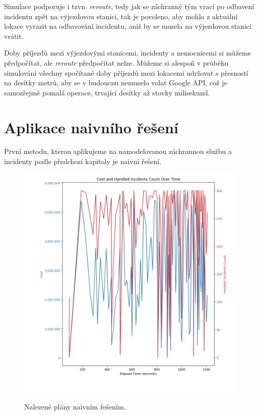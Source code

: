 Simulace podporuje i tzvn. \textit{reroute}, tedy jak se záchranný tým vrací po odbavení incidentu zpět na výjezdovou stanici,
tak je povoleno, aby mohlo z aktuální lokace vyrazit na odbavování incidentu, aniž by se musela na výjezdovou stanici vrátit.

Doby příjezdů mezi výjezdovými stanicemi, incidenty a nemocnicemi si můžeme předpočítat, ale \textit{reroute} předpočítat nelze.
Můžeme si alespoň v průběhu simulování všechny spočítané doby příjezdů mezi lokacemi udržovat s přesností na desítky metrů,
aby se v budoucnu nemuselo volat Google API, což je samozřejmě pomalá operace, trvající desítky až stovky milisekund. 

\section{Aplikace naivního řešení}

První metodu, kterou aplikujeme na namodelovanou záchrannou službu a incidenty podle předchozí kapitoly je naivní řešení.

\begin{figure}[H]
  \caption{Nalezené plány naivním řešením.}
  \includegraphics[width=\textwidth]{img/plots/naive.png}
  \centering
  \label{img:naive}
\end{figure}

